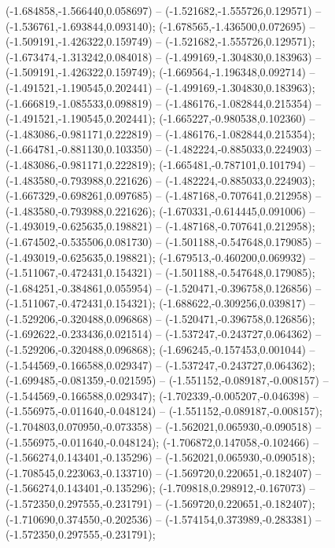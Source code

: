  (-1.684858,-1.566440,0.058697) -- (-1.521682,-1.555726,0.129571) -- (-1.536761,-1.693844,0.093140);
 (-1.678565,-1.436500,0.072695) -- (-1.509191,-1.426322,0.159749) -- (-1.521682,-1.555726,0.129571);
 (-1.673474,-1.313242,0.084018) -- (-1.499169,-1.304830,0.183963) -- (-1.509191,-1.426322,0.159749);
 (-1.669564,-1.196348,0.092714) -- (-1.491521,-1.190545,0.202441) -- (-1.499169,-1.304830,0.183963);
 (-1.666819,-1.085533,0.098819) -- (-1.486176,-1.082844,0.215354) -- (-1.491521,-1.190545,0.202441);
 (-1.665227,-0.980538,0.102360) -- (-1.483086,-0.981171,0.222819) -- (-1.486176,-1.082844,0.215354);
 (-1.664781,-0.881130,0.103350) -- (-1.482224,-0.885033,0.224903) -- (-1.483086,-0.981171,0.222819);
 (-1.665481,-0.787101,0.101794) -- (-1.483580,-0.793988,0.221626) -- (-1.482224,-0.885033,0.224903);
 (-1.667329,-0.698261,0.097685) -- (-1.487168,-0.707641,0.212958) -- (-1.483580,-0.793988,0.221626);
 (-1.670331,-0.614445,0.091006) -- (-1.493019,-0.625635,0.198821) -- (-1.487168,-0.707641,0.212958);
 (-1.674502,-0.535506,0.081730) -- (-1.501188,-0.547648,0.179085) -- (-1.493019,-0.625635,0.198821);
 (-1.679513,-0.460200,0.069932) -- (-1.511067,-0.472431,0.154321) -- (-1.501188,-0.547648,0.179085);
 (-1.684251,-0.384861,0.055954) -- (-1.520471,-0.396758,0.126856) -- (-1.511067,-0.472431,0.154321);
 (-1.688622,-0.309256,0.039817) -- (-1.529206,-0.320488,0.096868) -- (-1.520471,-0.396758,0.126856);
 (-1.692622,-0.233436,0.021514) -- (-1.537247,-0.243727,0.064362) -- (-1.529206,-0.320488,0.096868);
 (-1.696245,-0.157453,0.001044) -- (-1.544569,-0.166588,0.029347) -- (-1.537247,-0.243727,0.064362);
 (-1.699485,-0.081359,-0.021595) -- (-1.551152,-0.089187,-0.008157) -- (-1.544569,-0.166588,0.029347);
 (-1.702339,-0.005207,-0.046398) -- (-1.556975,-0.011640,-0.048124) -- (-1.551152,-0.089187,-0.008157);
 (-1.704803,0.070950,-0.073358) -- (-1.562021,0.065930,-0.090518) -- (-1.556975,-0.011640,-0.048124);
 (-1.706872,0.147058,-0.102466) -- (-1.566274,0.143401,-0.135296) -- (-1.562021,0.065930,-0.090518);
 (-1.708545,0.223063,-0.133710) -- (-1.569720,0.220651,-0.182407) -- (-1.566274,0.143401,-0.135296);
 (-1.709818,0.298912,-0.167073) -- (-1.572350,0.297555,-0.231791) -- (-1.569720,0.220651,-0.182407);
 (-1.710690,0.374550,-0.202536) -- (-1.574154,0.373989,-0.283381) -- (-1.572350,0.297555,-0.231791);
